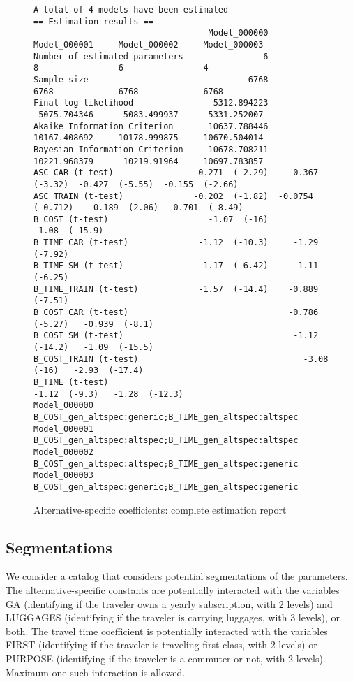 \documentclass[12pt,a4paper]{article}
\begin{document}
\begin{landscape}
  \begin{figure}[p]
    \begin{lstlisting}[basicstyle=\scriptsize]
A total of 4 models have been estimated
== Estimation results ==
                                   Model_000000       Model_000001     Model_000002     Model_000003
Number of estimated parameters                6                  8                6                4
Sample size                                6768               6768             6768             6768
Final log likelihood               -5312.894223       -5075.704346     -5083.499937     -5331.252007
Akaike Information Criterion       10637.788446       10167.408692     10178.999875     10670.504014
Bayesian Information Criterion     10678.708211       10221.968379      10219.91964     10697.783857
ASC_CAR (t-test)                -0.271  (-2.29)    -0.367  (-3.32)  -0.427  (-5.55)  -0.155  (-2.66)
ASC_TRAIN (t-test)              -0.202  (-1.82)  -0.0754  (-0.712)    0.189  (2.06)  -0.701  (-8.49)
B_COST (t-test)                    -1.07  (-16)                                       -1.08  (-15.9)
B_TIME_CAR (t-test)              -1.12  (-10.3)     -1.29  (-7.92)
B_TIME_SM (t-test)               -1.17  (-6.42)     -1.11  (-6.25)
B_TIME_TRAIN (t-test)            -1.57  (-14.4)    -0.889  (-7.51)
B_COST_CAR (t-test)                                -0.786  (-5.27)   -0.939  (-8.1)
B_COST_SM (t-test)                                  -1.12  (-14.2)   -1.09  (-15.5)
B_COST_TRAIN (t-test)                                 -3.08  (-16)   -2.93  (-17.4)
B_TIME (t-test)                                                       -1.12  (-9.3)   -1.28  (-12.3)
Model_000000	B_COST_gen_altspec:generic;B_TIME_gen_altspec:altspec
Model_000001	B_COST_gen_altspec:altspec;B_TIME_gen_altspec:altspec
Model_000002	B_COST_gen_altspec:altspec;B_TIME_gen_altspec:generic
Model_000003	B_COST_gen_altspec:generic;B_TIME_gen_altspec:generic
\end{lstlisting}
\caption{\label{fig:b03alt_spec}Alternative-specific coefficients: complete estimation report}
  \end{figure}
\end{landscape}

\subsection{Segmentations}

We consider a catalog that considers potential segmentations of the parameters. The alternative-specific constants are potentially interacted with the variables GA (identifying if the traveler owns a yearly subscription, with 2 levels) and LUGGAGES (identifying if the traveler is carrying luggages, with 3 levels), or both. The travel time coefficient is potentially interacted with the variables FIRST (identifying if the traveler is traveling first class, with 2 levels) or PURPOSE (identifying if the traveler is a commuter or not, with 2 levels). Maximum one such interaction is allowed.
\end{document}
